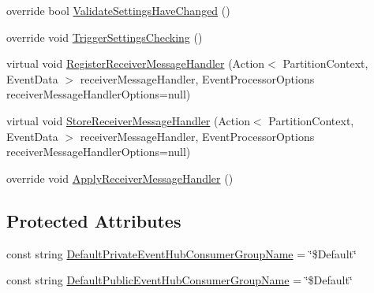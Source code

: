 \begin{DoxyCompactItemize}
\item 
override bool \hyperlink{classCqrs_1_1Azure_1_1ServiceBus_1_1AzureEventHub_afe8d6f93f97ab5658b81903af555632c_afe8d6f93f97ab5658b81903af555632c}{Validate\+Settings\+Have\+Changed} ()
\item 
override void \hyperlink{classCqrs_1_1Azure_1_1ServiceBus_1_1AzureEventHub_a779ce1115cf00dfaf072056a6ad8f9fe_a779ce1115cf00dfaf072056a6ad8f9fe}{Trigger\+Settings\+Checking} ()
\item 
virtual void \hyperlink{classCqrs_1_1Azure_1_1ServiceBus_1_1AzureEventHub_afbea0e107f3d4e8f8d4f2215ff2f7787_afbea0e107f3d4e8f8d4f2215ff2f7787}{Register\+Receiver\+Message\+Handler} (Action$<$ Partition\+Context, Event\+Data $>$ receiver\+Message\+Handler, Event\+Processor\+Options receiver\+Message\+Handler\+Options=null)
\item 
virtual void \hyperlink{classCqrs_1_1Azure_1_1ServiceBus_1_1AzureEventHub_a5924517b1e88c09e3c0c1aec9c737a8d_a5924517b1e88c09e3c0c1aec9c737a8d}{Store\+Receiver\+Message\+Handler} (Action$<$ Partition\+Context, Event\+Data $>$ receiver\+Message\+Handler, Event\+Processor\+Options receiver\+Message\+Handler\+Options=null)
\item 
override void \hyperlink{classCqrs_1_1Azure_1_1ServiceBus_1_1AzureEventHub_af2efc497815828b6fe0b4d6621bc8b41_af2efc497815828b6fe0b4d6621bc8b41}{Apply\+Receiver\+Message\+Handler} ()
\end{DoxyCompactItemize}
\subsection*{Protected Attributes}
\begin{DoxyCompactItemize}
\item 
const string \hyperlink{classCqrs_1_1Azure_1_1ServiceBus_1_1AzureEventHub_a523df6f08c43b3ca013c08555098f4ad_a523df6f08c43b3ca013c08555098f4ad}{Default\+Private\+Event\+Hub\+Consumer\+Group\+Name} = \char`\"{}\$Default\char`\"{}
\item 
const string \hyperlink{classCqrs_1_1Azure_1_1ServiceBus_1_1AzureEventHub_a71191dfe0cccbbc59c37cadf051a5cdd_a71191dfe0cccbbc59c37cadf051a5cdd}{Default\+Public\+Event\+Hub\+Consumer\+Group\+Name} = \char`\"{}\$Default\char`\"{}
\end{DoxyCompactItemize}

